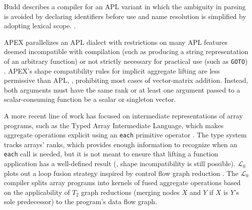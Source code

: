 Budd describes a compiler for an APL variant
in which the ambiguity in parsing is avoided by
declaring identifiers before use
and name resolution is simplified by adopting lexical scope.
\cite{BuddCompiler}.

APEX parallelizes an APL dialect
with restrictions on many APL features deemed
incompatible with compilation
(such as producing a string representation of an arbitrary function)
or not strictly necessary for practical use (such as {\tt GOTO}) \cite{Apex}.
APEX's shape compatibility rules for implicit aggregate lifting
are less permissive than APL,
\eg, prohibiting most cases of vector-matrix addition.
Instead, both arguments must have the same rank
or at least one argument passed to a scalar-consuming function
be a scalar or singleton vector.

A more recent line of work has focused on
intermediate representations of array programs,
such as the Typed Array Intermediate Language,
which makes aggregate operations explicit
using an {\tt each} primitive operator \cite{APLTAIL}.
The type system tracks arrays' ranks,
which provides enough information to recognize
when an {\tt each} call is needed,
but it is not meant to ensure that
lifting a function application has a well-defined result
(\ie, shape incompatibility is still possible).
$\mathcal{L}_0$ plots out a loop fusion strategy
inspired by control flow graph reduction \cite{T2GraphReduction}.
The $\mathcal{L}_0$ compiler splits array programs
into kernels of fused aggregate operations
based on the applicability of $T_2$ graph reductions
(merging nodes $X$ and $Y$ if $X$ is $Y$'s sole predecessor)
to the program's data flow graph.


